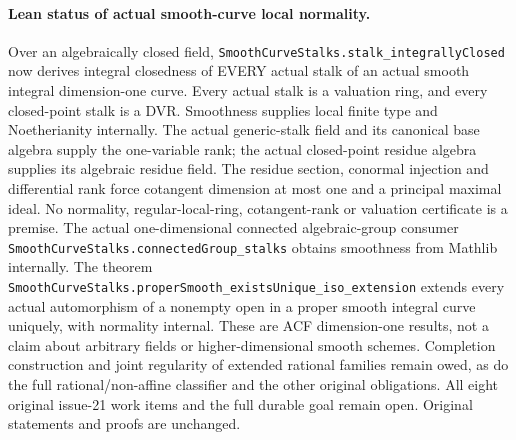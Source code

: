 \documentclass[11pt,oneside]{article}
\theoremstyle{definition}
\theoremstyle{remark}
\newcommand{\lean}[1]{\nolinkurl{#1}}
\begin{document}
\paragraph{Lean status of actual smooth-curve local normality.}
Over an algebraically closed field, \lean{SmoothCurveStalks.stalk_integrallyClosed}
now derives integral closedness of EVERY actual stalk of an actual smooth integral
dimension-one curve. Every actual stalk is a valuation ring, and every closed-point
stalk is a DVR. Smoothness supplies local finite type and Noetherianity internally.
The actual generic-stalk field and its canonical base algebra supply the one-variable
rank; the actual closed-point residue algebra supplies its algebraic residue field.
The residue section, conormal injection and differential rank force cotangent dimension
at most one and a principal maximal ideal. No normality, regular-local-ring, cotangent-rank
or valuation certificate is a premise. The actual one-dimensional connected algebraic-group
consumer \lean{SmoothCurveStalks.connectedGroup_stalks} obtains smoothness from Mathlib
internally. The theorem \lean{SmoothCurveStalks.properSmooth_existsUnique_iso_extension}
extends every actual automorphism of a nonempty open in a proper smooth integral curve
uniquely, with normality internal. These are ACF dimension-one results, not a claim about
arbitrary fields or higher-dimensional smooth schemes. Completion construction and joint
regularity of extended rational families remain owed, as do the full rational/non-affine
classifier and the other original obligations. All eight original issue-21 work items
and the full durable goal remain open. Original statements and proofs are unchanged.
\end{document}
